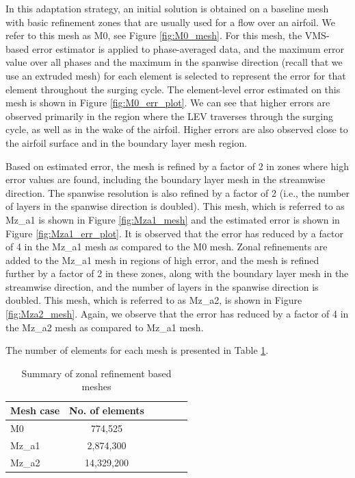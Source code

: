 In this adaptation strategy, an initial solution is obtained on a baseline mesh with basic refinement zones that are usually used for a flow over an airfoil. We refer to this mesh as M0, see Figure \ref{fig:M0_mesh}. 
For this mesh, the VMS-based error estimator is applied to phase-averaged data, and the maximum error value over all phases and the maximum in the spanwise direction (recall that we use an extruded mesh) for each element is selected to represent the error for that element throughout the surging cycle. 
The element-level error estimated on this mesh is shown in Figure \ref{fig:M0_err_plot}. We can see that higher errors are observed primarily in the region where the LEV traverses through the surging cycle, as well as in the wake of the airfoil. Higher errors are also observed close to the airfoil surface and in the boundary layer mesh region.

Based on estimated error, the mesh is refined by a factor of 2 in zones where high error values are found, including the boundary layer mesh in the streamwise direction. The spanwise resolution is also refined by a factor of 2 (i.e., the number of layers in the spanwise direction is doubled). 
This mesh, which is referred to as Mz\_a1 is shown in Figure \ref{fig:Mza1_mesh} and the estimated error is shown in Figure \ref{fig:Mza1_err_plot}. It is observed that the error has reduced by a factor of 4 in the Mz\_a1 mesh as compared to the M0 mesh.
Zonal refinements are added to the Mz\_a1 mesh in regions of high error, and the mesh is refined further by a factor of 2 in these zones, along with the boundary layer mesh in the streamwise direction, and the number of layers in the spanwise direction is doubled.  This mesh, which is referred to as Mz\_a2, is shown in Figure \ref{fig:Mza2_mesh}. Again, we observe that the error has reduced by a factor of 4 in the Mz\_a2 mesh as compared to Mz\_a1 mesh.

The number of elements for each mesh is presented in Table \ref{table:mesh_zonal_summary}.

\begin{table}[H]
	\centering
	\caption{Summary of zonal refinement based meshes}
	\label{table:mesh_zonal_summary}
	\begin{tabular}{|l|c|c|c|c|c|}
		\hline
		Mesh case  & No. of elements\\
		\hline
		\hline
		M0 & 774,525 \\
		\hline
		Mz\_a1 &  2,874,300 \\
		\hline
		Mz\_a2 & 14,329,200 \\
		\hline
	\end{tabular}
	
\end{table}

